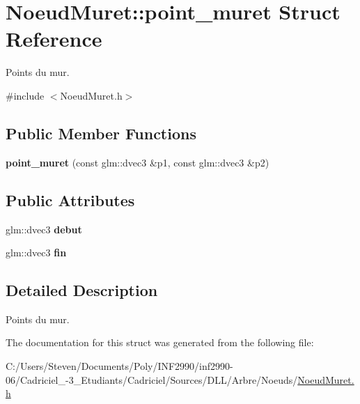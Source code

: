 \hypertarget{struct_noeud_muret_1_1point__muret}{}\section{Noeud\+Muret\+:\+:point\+\_\+muret Struct Reference}
\label{struct_noeud_muret_1_1point__muret}


Points du mur.  




{\ttfamily \#include $<$Noeud\+Muret.\+h$>$}

\subsection*{Public Member Functions}
\begin{DoxyCompactItemize}
\item 
\hypertarget{struct_noeud_muret_1_1point__muret_ac69905e3fbbfe9a0453ab78cb20aa44b}{}\label{struct_noeud_muret_1_1point__muret_ac69905e3fbbfe9a0453ab78cb20aa44b} 
{\bfseries point\+\_\+muret} (const glm\+::dvec3 \&p1, const glm\+::dvec3 \&p2)
\end{DoxyCompactItemize}
\subsection*{Public Attributes}
\begin{DoxyCompactItemize}
\item 
\hypertarget{struct_noeud_muret_1_1point__muret_a294381a61a5e78afcdb60902dee1c3c5}{}\label{struct_noeud_muret_1_1point__muret_a294381a61a5e78afcdb60902dee1c3c5} 
glm\+::dvec3 {\bfseries debut}
\item 
\hypertarget{struct_noeud_muret_1_1point__muret_ad2a2e0f42dd5c60dec0489cfe82ecb98}{}\label{struct_noeud_muret_1_1point__muret_ad2a2e0f42dd5c60dec0489cfe82ecb98} 
glm\+::dvec3 {\bfseries fin}
\end{DoxyCompactItemize}


\subsection{Detailed Description}
Points du mur. 

The documentation for this struct was generated from the following file\+:\begin{DoxyCompactItemize}
\item 
C\+:/\+Users/\+Steven/\+Documents/\+Poly/\+I\+N\+F2990/inf2990-\/06/\+Cadriciel\+\_-\/3\+\_\+\+Etudiants/\+Cadriciel/\+Sources/\+D\+L\+L/\+Arbre/\+Noeuds/\hyperlink{_noeud_muret_8h}{Noeud\+Muret.\+h}\end{DoxyCompactItemize}
